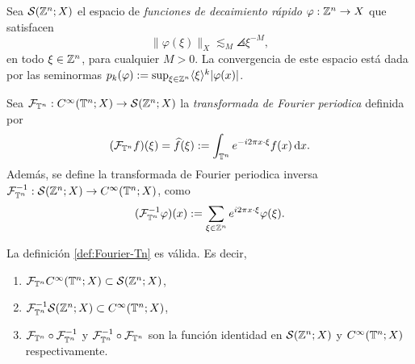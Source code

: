 \begin{definition}
	Sea $\mathcal{S}(\mathbb{Z}^n;X)$ el espacio de \textit{funciones de decaimiento rápido} $\varphi:\mathbb{Z}^n\rightarrow X$ que satisfacen  
	\begin{equation*}
		\|\varphi(\xi)\|_X \lesssim_M \angles{\xi}^{-M},
	\end{equation*}
	en todo $\xi\in\mathbb{Z}^n$, para cualquier $M>0$. La convergencia de este espacio está dada por las seminormas $p_k(\varphi) := \sup_{\xi\in\mathbb{Z}^n}\langle\xi\rangle^k|\varphi(x)|$.
\end{definition}  
\begin{definition}\label{def:Fourier-Tn}
	Sea $\mathcal{F}_{\mathbb{T}^n}:C^\infty(\mathbb{T}^n;X) \rightarrow\mathcal{S}(\mathbb{Z}^n;X)$ la \textit{transformada de Fourier periodica} definida por 
	\begin{equation*}
		(\mathcal{F}_{\mathbb{T}^n}f)(\xi) = \widehat{f}(\xi) := \int_{\mathbb{T}^n} e^{-i2\pi x\cdot\xi} f(x) \mathop{}\!\mathrm{d} x.
	\end{equation*}
	Además, se define la transformada de Fourier periodica inversa $\mathcal{F}_{\mathbb{T}^n}^{-1}:\mathcal{S}(\mathbb{Z}^n;X)\rightarrow C^\infty(\mathbb{T}^n;X)$, como
	\begin{equation*}
		(\mathcal{F}_{\mathbb{T}^n}^{-1}\varphi)(x)  := \sum_{\xi\in\mathbb{Z}^n} e^{i2\pi x\cdot\xi} \varphi(\xi).
	\end{equation*}
\end{definition}
\begin{theorem}
	La definición \ref{def:Fourier-Tn} es válida. Es decir, 
	\begin{enumerate}
		\item $\mathcal{F}_{\mathbb{T}^n}C^\infty(\mathbb{T}^n;X) \subset \mathcal{S}(\mathbb{Z}^n;X)$,
		\item $\mathcal{F}_{\mathbb{T}^n}^{-1} \mathcal{S}(\mathbb{Z}^n;X) \subset C^\infty(\mathbb{T}^n;X)$,
		\item $\mathcal{F}_{\mathbb{T}^n} \circ \mathcal{F}_{\mathbb{T}^n}^{-1}$ y $\mathcal{F}_{\mathbb{T}^n}^{-1} \circ \mathcal{F}_{\mathbb{T}^n}$ son la función identidad en $\mathcal{S}(\mathbb{Z}^n;X)$ y $C^\infty(\mathbb{T}^n;X)$ respectivamente.
	\end{enumerate}
\end{theorem}
